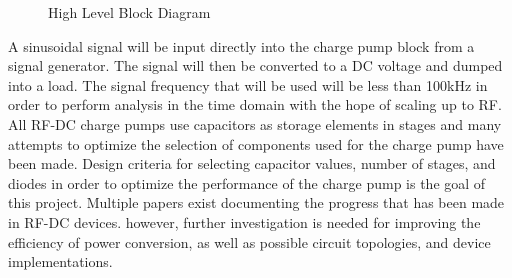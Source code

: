 \documentclass[12pt]{article}
\begin{document}
\begin{figure}[H]
\caption{High Level Block Diagram}
\label{fig:HighLevel}
\end{figure}
	
\noindent A sinusoidal signal will be input directly into the charge pump block from a signal generator. The signal will then be converted to a DC voltage and dumped into a load. The signal frequency that will be used will be less than 100kHz in order to perform analysis in the time domain with the hope of scaling up to RF. \\

\noindent All RF-DC charge pumps use capacitors as storage elements in stages and many attempts to optimize the selection of components used for the charge pump have been made. Design criteria for selecting capacitor values, number of stages, and diodes in order to optimize the performance of the charge pump is the goal of this project. Multiple papers exist documenting the progress that has been made in RF-DC devices. however, further investigation is needed for improving the efficiency of power conversion, as well as possible circuit topologies, and device implementations. 
	
\end{document}
